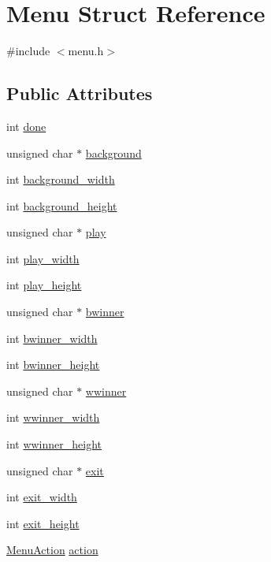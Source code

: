 \hypertarget{structMenu}{}\section{Menu Struct Reference}
\label{structMenu}


{\ttfamily \#include $<$menu.\+h$>$}

\subsection*{Public Attributes}
\begin{DoxyCompactItemize}
\item 
int \hyperlink{structMenu_a457588a82fea9415b58c5b9ee2595e88}{done}
\item 
unsigned char $\ast$ \hyperlink{structMenu_ae1afb1a4c1a48995dbc99aba8cb3ea09}{background}
\item 
int \hyperlink{structMenu_a58782cb93b5c0be925192ec69430abff}{background\+\_\+width}
\item 
int \hyperlink{structMenu_a9766ba80e9f48d5ca685572724be1a1f}{background\+\_\+height}
\item 
unsigned char $\ast$ \hyperlink{structMenu_a97c8de98a5b43b75e8a049db832427e3}{play}
\item 
int \hyperlink{structMenu_a5ffb3bd78cd87f2d26c09b274cb33caf}{play\+\_\+width}
\item 
int \hyperlink{structMenu_a88a30a9449606bab297bffab5818aad7}{play\+\_\+height}
\item 
unsigned char $\ast$ \hyperlink{structMenu_a99635834abf927c6f5a1e48d7aa443fd}{bwinner}
\item 
int \hyperlink{structMenu_acb0ab046c68de9fb392b7f4ba139c9ed}{bwinner\+\_\+width}
\item 
int \hyperlink{structMenu_ae7eb58473d40dc9d1c76c987fadafe0e}{bwinner\+\_\+height}
\item 
unsigned char $\ast$ \hyperlink{structMenu_aee41aa16055cd2c8ea7cb289d8011300}{wwinner}
\item 
int \hyperlink{structMenu_a3b16162ce3451366bdd585c3ddcca9bb}{wwinner\+\_\+width}
\item 
int \hyperlink{structMenu_ad6e879577aed24c8628f7041874ee244}{wwinner\+\_\+height}
\item 
unsigned char $\ast$ \hyperlink{structMenu_a56b38d2255ea43c1625f9d828fee9a28}{exit}
\item 
int \hyperlink{structMenu_a1f1abb83a7eda64961d0ab106758070b}{exit\+\_\+width}
\item 
int \hyperlink{structMenu_a7bfc348718a60afb1172985576d47d62}{exit\+\_\+height}
\item 
\hyperlink{group__Menu_gab99074a1f6b7e8ff7730342913aae3a3}{Menu\+Action} \hyperlink{structMenu_a01fc9d0084bc760f9d1e66462a8a75b7}{action}
\end{DoxyCompactItemize}


